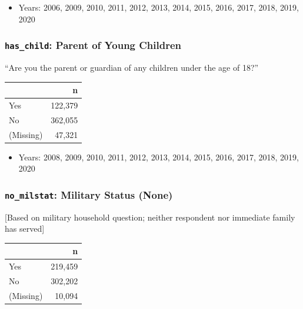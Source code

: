 \documentclass[10pt,article,oneside]{memoir}
\theoremstyle{definition}
\begin{document}
\begin{itemize}
\tightlist
\item
  Years: 2006, 2009, 2010, 2011, 2012, 2013, 2014, 2015, 2016, 2017,
  2018, 2019, 2020
\end{itemize}

\hypertarget{has_child-parent-of-young-children}{%
\subsubsection{\texorpdfstring{\texttt{has\_child}: Parent of Young
Children}{has\_child: Parent of Young Children}}\label{has_child-parent-of-young-children}}

``Are you the parent or guardian of any children under the age of 18?''

\begin{table}[H]
\centering
\begin{tabular}{lr}
\toprule
 & n\\
\midrule
Yes & 122,379\\
No & 362,055\\
(Missing) & 47,321\\
\bottomrule
\end{tabular}
\end{table}

\begin{itemize}
\tightlist
\item
  Years: 2008, 2009, 2010, 2011, 2012, 2013, 2014, 2015, 2016, 2017,
  2018, 2019, 2020
\end{itemize}

\hypertarget{no_milstat-military-status-none}{%
\subsubsection{\texorpdfstring{\texttt{no\_milstat}: Military Status
(None)}{no\_milstat: Military Status (None)}}\label{no_milstat-military-status-none}}

{[}Based on military household question; neither respondent nor
immediate family has served{]}

\begin{table}[H]
\centering
\begin{tabular}{lr}
\toprule
 & n\\
\midrule
Yes & 219,459\\
No & 302,202\\
(Missing) & 10,094\\
\bottomrule
\end{tabular}
\end{table}
\end{document}
